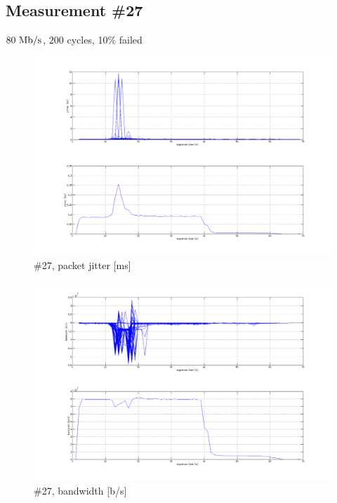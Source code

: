 \subsection{Measurement \#27}
$80~\mathrm{Mb/s}$, $200$ cycles, 10\% failed
\begin{figure}[htb]
	\begin{center}
	\includegraphics[width=\textwidth]{results-274-all.png}
	\end{center}
	\caption[]{\#27, packet jitter [ms]}
	\label{img:results-274-all.png}
\end{figure}
\begin{figure}[htb]
	\begin{center}
	\includegraphics[width=\textwidth]{results-279-all.png}
	\end{center}
	\caption[]{\#27, bandwidth [b/s]}
	\label{img:results-279-all.png}
\end{figure}

